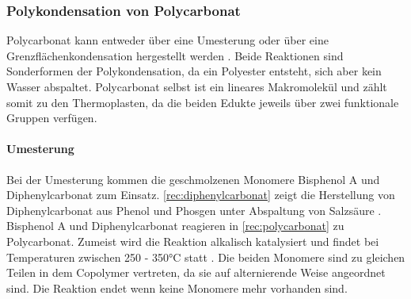 \subsubsection{Polykondensation von Polycarbonat}

Polycarbonat kann entweder über eine Umesterung oder über eine
Grenzflächenkondensation hergestellt werden \cite{cuzpe}. Beide Reaktionen sind
Sonderformen der Polykondensation, da ein Polyester entsteht, sich aber kein
Wasser abspaltet. Polycarbonat selbst ist ein lineares Makromolekül und zählt
somit zu den Thermoplasten, da die beiden Edukte jeweils über zwei funktionale
Gruppen verfügen.

\paragraph{Umesterung} Bei der Umesterung kommen die geschmolzenen Monomere
Bisphenol A und Diphenylcarbonat zum Einsatz. \autoref{rec:diphenylcarbonat}
zeigt die Herstellung von Diphenylcarbonat aus Phenol und Phosgen unter
Abspaltung von Salzsäure \cite{cuzpe}. Bisphenol A und Diphenylcarbonat
reagieren in \autoref{rec:polycarbonat} zu Polycarbonat. Zumeist wird die
Reaktion alkalisch katalysiert und findet bei Temperaturen zwischen 250 - 350°C
statt \cite{pop}. Die beiden Monomere sind zu gleichen Teilen in dem Copolymer
vertreten, da sie auf alternierende Weise angeordnet sind. Die Reaktion endet
wenn keine Monomere mehr vorhanden sind.


